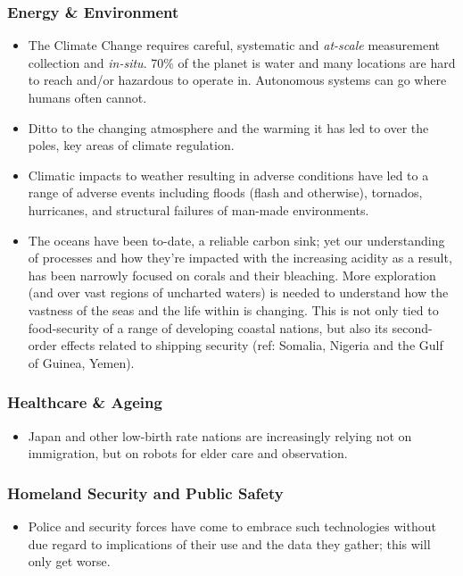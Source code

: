 \documentclass[11pt,letterpaper]{article}
\begin{document}
\subsubsection{Energy \& Environment}
\begin{itemize}

\item The Climate Change requires careful, systematic and
  \emph{at-scale} measurement collection and \emph{in-situ}. 70\% of
  the planet is water and many locations are hard to reach and/or
  hazardous to operate in. Autonomous systems can go where humans
  often cannot.

\item Ditto to the changing atmosphere and the warming it has led to
  over the poles, key areas of climate regulation.

\item Climatic impacts to weather resulting in adverse conditions have
  led to a range of adverse events including floods (flash and
  otherwise), tornados, hurricanes, and structural failures of man-made
  environments. 

\item The oceans have been to-date, a reliable carbon sink; yet our
  understanding of processes and how they're impacted with the
  increasing acidity as a result, has been narrowly focused on corals
  and their bleaching. More exploration (and over vast regions of
  uncharted waters) is needed to understand how the vastness of the
  seas and the life within is changing. This is not only tied to
  food-security of a range of developing coastal nations, but also its
  second-order effects related to shipping security (ref: Somalia,
  Nigeria and the Gulf of Guinea, Yemen).

\end{itemize}

\subsubsection{Healthcare \& Ageing}
\begin{itemize}
\item Japan and other low-birth rate nations are increasingly relying
  not on immigration, but on robots for elder care and observation. 

\end{itemize}

\subsubsection{Homeland Security and Public Safety}
\begin{itemize}

\item Police and security forces have come to embrace such
  technologies without due regard to implications of their use and the
  data they gather; this will only get worse.

\end{itemize}
\end{document}
